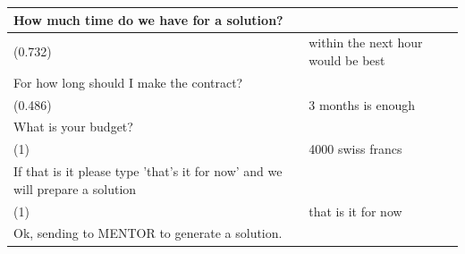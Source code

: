 \begin{table}[!h]
{\begin{tabular}{|l|l|}
\hline
How much time do we have for a solution?                                                                                                                                        &                                                  \\ 
\hline
(0.732)                                                                                                                                                                                & within the next hour would be best               \\ 
\hline
For how long should I make the contract?                                                                                                                                        &                                                  \\ 
\hline
(0.486)                                                                                                                                                                                & 3 months is enough                               \\ 
\hline
What is your budget?                                                                                                                                                            &                                                  \\ 
\hline
(1)                                                                                                                                                                                & 4000 swiss francs                                \\ 
\hline
If that is it please type 'that's it for now' and we will prepare a solution                                                                                                    &                                                  \\ 
\hline
(1)                                                                                                                                                                                & that is it for now                               \\ 
\hline
{Ok, sending to MENTOR to generate a solution.}                                                                                               &                                                  \\
\hline
\end{tabular}
}
\end{table}

